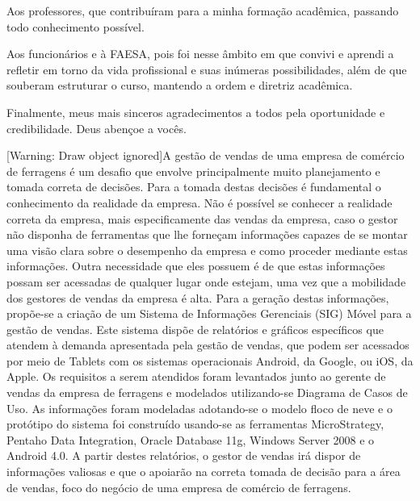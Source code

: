 \documentclass[a4paper]{article}
\begin{document}
{
\textsf{Aos professores, que contribu\'iram para a minha forma\c{c}\~ao acad\^emica, passando todo conhecimento
poss\'ivel.}}

{
\textsf{Aos funcion\'arios e \`a FAESA, pois foi nesse \^ambito em que convivi e aprendi a refletir em torno da vida
profissional e suas in\'umeras possibilidades, al\'em de que souberam estruturar o curso, mantendo a ordem e diretriz
acad\^emica.}}

{
\textsf{Finalmente, meus mais sinceros agradecimentos a todos pela oportunidade e credibilidade. Deus aben\c{c}oe a
voc\^es.}\textsf{\textbf{ }}}



\bigskip

{
[Warning: Draw object ignored]\textsf{A gest\~ao de vendas de uma empresa de com\'ercio de ferragens \'e um desafio que
envolve principalmente muito planejamento e tomada correta de decis\~oes. Para a tomada destas decis\~oes \'e
fundamental o conhecimento da realidade da empresa. N\~ao \'e poss\'ivel se conhecer a realidade correta da empresa,
mais especificamente das vendas da empresa, caso o gestor n\~ao disponha de ferramentas que lhe forne\c{c}am
informa\c{c}\~oes capazes de se montar uma vis\~ao clara sobre o desempenho da empresa e como proceder mediante estas
informa\c{c}\~oes. Outra necessidade que eles possuem \'e de que estas informa\c{c}\~oes possam ser acessadas de
qualquer lugar onde estejam, uma vez que a mobilidade dos gestores de vendas da empresa \'e alta. Para a gera\c{c}\~ao
destas informa\c{c}\~oes, prop\~oe-se a cria\c{c}\~ao de um Sistema de Informa\c{c}\~oes Gerenciais (SIG) M\'ovel para
a gest\~ao de vendas. Este sistema disp\~oe de relat\'orios e gr\'aficos espec\'ificos que atendem \`a demanda
apresentada pela gest\~ao de vendas, que podem ser acessados por meio de Tablets com os sistemas operacionais Android,
da Google, ou iOS, da Apple. Os requisitos a serem atendidos foram levantados junto ao gerente de vendas da empresa de
ferragens e modelados utilizando-se Diagrama de Casos de Uso. As informa\c{c}\~oes foram modeladas adotando-se o modelo
floco de neve e o prot\'otipo do sistema foi constru\'ido usando-se as ferramentas MicroStrategy, Pentaho Data
Integration, Oracle Database 11g, Windows Server 2008 e o Android 4.0. A partir destes relat\'orios, o gestor de vendas
ir\'a dispor de informa\c{c}\~oes valiosas e que o apoiar\~ao na correta tomada de decis\~ao para a \'area de vendas,
foco do neg\'ocio de uma empresa de com\'ercio de ferragens.}\foreignlanguage{portuges}{\textsf{ }}}
\end{document}
